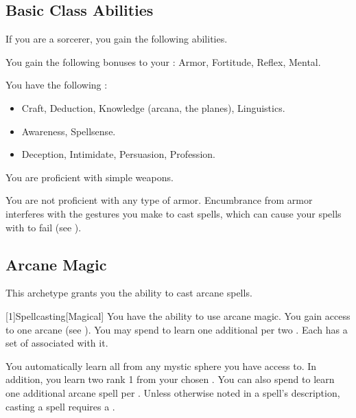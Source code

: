     \subsection{Basic Class Abilities}
        If you are a sorcerer, you gain the following abilities.

        You gain the following bonuses to your :  Armor,  Fortitude,  Reflex,  Mental.

        You have the following :
        \begin{itemize}
            \item {} Craft, Deduction, Knowledge (arcana, the planes), Linguistics.
            \item {} Awareness, Spellsense.
            \item {} Deception, Intimidate, Persuasion, Profession.
        \end{itemize}

        You are proficient with simple weapons.

        You are not proficient with any type of armor.
        Encumbrance from armor interferes with the gestures you make to cast spells, which can cause your spells with  to fail (see ).

    \subsection{Arcane Magic}
        This archetype grants you the ability to cast arcane spells.

        [1]{Spellcasting}[Magical]
        You have the ability to use arcane magic.
        You gain access to one arcane  (see ).
        You may spend  to learn one additional  per two .
        Each  has a set of  associated with it.

        You automatically learn all  from any mystic sphere you have access to.
        In addition, you learn two rank 1  from your chosen .
        You can also spend  to learn one additional arcane spell per .
        Unless otherwise noted in a spell's description, casting a spell requires a .

